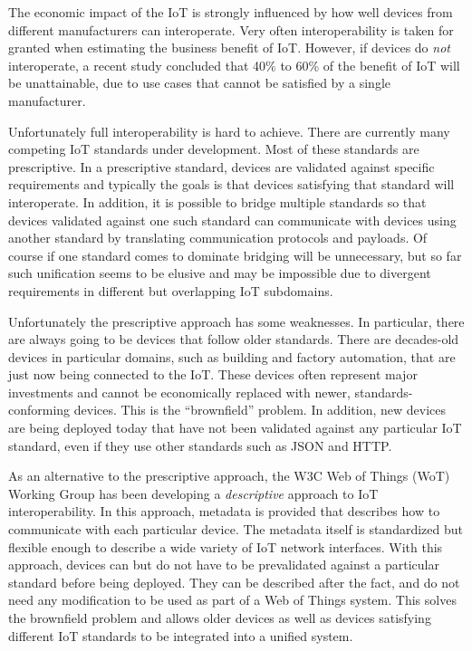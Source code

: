 The economic impact of the IoT is strongly influenced by how well devices from 
different manufacturers can interoperate.
Very often interoperability is taken for granted when estimating the business
benefit of IoT. 
However, if devices do \emph{not} interoperate,
a recent study \cite{McK2015a} concluded that 40\% to 60\% of the 
benefit of IoT will be unattainable,
due to use cases that cannot be satisfied by a single manufacturer.

Unfortunately full interoperability is hard to achieve.
There are currently many competing IoT standards under development.
Most of these standards are prescriptive.
In a prescriptive standard, devices are validated against specific requirements
and typically the goals is that devices satisfying that standard will interoperate.
In addition, it is possible to bridge multiple standards so that
devices validated against one such standard can communicate with
devices using another standard by translating communication protocols and payloads.
Of course if one standard comes to dominate bridging will be unnecessary,
but so far such unification seems to be elusive and may be impossible due to
divergent requirements in different but overlapping IoT subdomains.

Unfortunately the prescriptive approach has some weaknesses.
In particular, there are always going to be devices that follow older standards.
There are decades-old devices in particular domains, such as building and factory
automation, that are just now being connected to the IoT.
These devices often represent major investments and cannot be economically replaced with newer,
standards-conforming devices.
This is the ``brownfield'' problem.
In addition, new devices are being deployed today that have not been validated
against any particular IoT standard,
even if they use other standards such as JSON and HTTP.

As an alternative to the prescriptive approach,
the W3C Web of Things (WoT) Working Group has been developing a \emph{descriptive} 
approach to IoT interoperability.
In this approach,
metadata is provided that describes how to communicate with each particular device.
The metadata itself is standardized but flexible enough to describe a wide variety of
IoT network interfaces.
With this approach,
devices can but do not have to be prevalidated against 
a particular standard before being deployed.
They can be described after the fact, and do not need any modification to be
used as part of a Web of Things system.
This solves the brownfield problem and allows
older devices as well as devices satisfying different IoT 
standards to be integrated into a unified system.  

